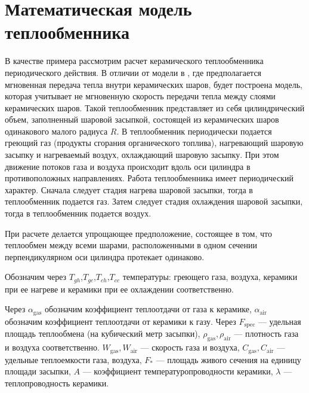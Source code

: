 \documentclass[a4paper,12pt]{article}
\begin{document}
\section{Математическая модель теплообменника}

В качестве примера рассмотрим расчет керамического теплообменника
периодического действия. В отличии от модели в \cite{KMP2018}, где
предполагается мгновенная передача тепла внутри керамических шаров,
будет построена модель, которая учитывает не мгновенную скорость
передачи тепла между слоями керамических шаров. Такой теплообменник
представляет из себя цилиндрический объем, заполненный шаровой
засыпкой, состоящей из керамических шаров одинакового малого радиуса
$R$. В теплообменник периодически подается греющий газ (продукты
сгорания органического топлива), нагревающий шаровую засыпку и
нагреваемый воздух, охлаждающий шаровую засыпку. При этом движение
потоков газа и воздуха происходит вдоль оси цилиндра в противоположных
направлениях. Работа теплообменника имеет периодический характер.
Сначала следует стадия нагрева шаровой засыпки, тогда в теплообменник
подается газ. Затем следует стадия охлаждения шаровой засыпки, тогда в
теплообменник подается воздух.

При расчете делается упрощающее предположение, состоящее в том, что
теплообмен между всеми шарами, расположенными в одном сечении
перпендикулярном оси цилиндра протекает одинаково.

Обозначим через $T_{gh}$,$T_{gc}$,$T_{ch}$,$T_{cc}$ температуры: греющего
газа, воздуха, керамики при ее нагреве и керамики при ее охлаждении
соответственно.

Через $\alpha_{\text{gas}}$ обозначим коэффициент теплоотдачи от газа к
керамике, $\alpha_{\text{air}}$ обозначим коэффициент теплоотдачи от
керамики к газу. Через $F_{\text{spec}}$  --- удельная площадь теплообмена
(на кубический метр
засыпки), $\rho_{\text{gas}}, \rho_{\text{air}}$ --- плотность газа и воздуха
соответственно. $W_{\text{gas}},W_{\text{air}}$ --- скорость газа и
воздуха, $C_{\text{gas}},C_{\text{air}}$ --- удельные теплоемкости газа,
воздуха, $F_{*}$ --- площадь живого сечения
на единицу площади засыпки, $A$ --- коэффициент температуропроводности керамики,
$\lambda$ --- теплопроводность керамики.
\end{document}
